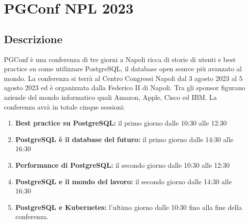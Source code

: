 \section{PGConf NPL 2023}
\subsection{Descrizione}
PGConf è una conferenza di tre giorni a Napoli ricca di storie di utenti e best practice su come utilizzare PostgreSQL, il database open source più avanzato al mondo. La conferenza si terrà al Centro Congressi Napoli dal 3 agosto 2023 al 5 agosto 2023 ed è organizzata dalla Federico II di Napoli. Tra gli sponsor figurano aziende del mondo informatico quali Amazon, Apple, Cisco ed IBM.
La conferenza avrà in totale cinque sessioni:
\begin{enumerate}
	\item \textbf{Best practice su PostgreSQL:} il primo giorno dalle 10:30 alle 12:30
	\item \textbf{PostgreSQL è il database del futuro:} il primo giorno dalle 14:30 alle 16:30
	\item \textbf{Performance di PostgreSQL:} il secondo giorno dalle 10:30 alle 12:30
	\item \textbf{PostgreSQL e il mondo del lavoro:} il secondo giorno dalle 14:30 alle 16:30
	\item \textbf{PostgreSQL e Kubernetes:} l'ultimo giorno dalle 10:30 fino alla fine della conferenza.
\end{enumerate}